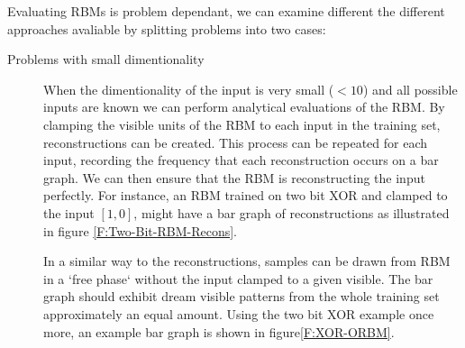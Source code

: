   Evaluating RBMs is problem dependant, we can examine different the different approaches avaliable by splitting problems into two cases:
  \begin{description}
  \item[Problems with small dimentionality] When the dimentionality of the input is very small ($<10$) and all possible inputs are known we can perform analytical evaluations of the RBM. By clamping the visible units of the RBM to each input in the training set, reconstructions can be created. This process can be repeated for each input, recording the frequency that each reconstruction occurs on a bar graph. We can then ensure that the RBM is reconstructing the input perfectly. For instance, an RBM trained on two bit XOR and clamped to the input $[1,0]$, might have a bar graph of reconstructions as illustrated in figure \ref{F:Two-Bit-RBM-Recons}.

  In a similar way to the reconstructions, samples can be drawn from RBM in a `free phase` without the input clamped to a given visible. The bar graph should exhibit dream visible patterns from the whole training set approximately an equal amount. Using the two bit XOR example once more, an example bar graph is shown in figure\ref{F:XOR-ORBM}.



\end{description}
